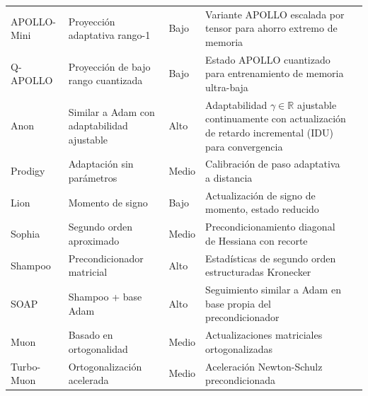 \begin{longtable}{p{2.2cm}p{2.8cm}p{2.0cm}p{5.4cm}p{1.8cm}}
APOLLO-Mini & Proyección adaptativa rango-1 & Bajo & Variante APOLLO escalada por tensor para ahorro extremo de memoria & \citep{zhu2025apollosgdlikememoryadamwlevel} \\
Q-APOLLO & Proyección de bajo rango cuantizada & Bajo & Estado APOLLO cuantizado para entrenamiento de memoria ultra-baja & \citep{zhu2025apollosgdlikememoryadamwlevel} \\
Anon & Similar a Adam con adaptabilidad ajustable & Alto & Adaptabilidad $\gamma \in \mathbb{R}$ ajustable continuamente con actualización de retardo incremental (IDU) para convergencia & \citep{anon2026anon} \\
Prodigy & Adaptación sin parámetros & Medio & Calibración de paso adaptativa a distancia & \citep{mishchenko_prodigy_2023} \\
Lion & Momento de signo & Bajo & Actualización de signo de momento, estado reducido & \citep{chen_symbolic_2023} \\
Sophia & Segundo orden aproximado & Medio & Precondicionamiento diagonal de Hessiana con recorte & \citep{liu_sophia_2023} \\
Shampoo & Precondicionador matricial & Alto & Estadísticas de segundo orden estructuradas Kronecker & \citep{gupta_shampoo_2018} \\
SOAP & Shampoo + base Adam & Alto & Seguimiento similar a Adam en base propia del precondicionador & \citep{vyas_soap_2024} \\
Muon & Basado en ortogonalidad & Medio & Actualizaciones matriciales ortogonalizadas & \citep{shen_convergence_2025} \\
Turbo-Muon & Ortogonalización acelerada & Medio & Aceleración Newton-Schulz precondicionada & \citep{boissin_turbo-muon_2025} \\
\bottomrule
\end{longtable}
\normalsize

